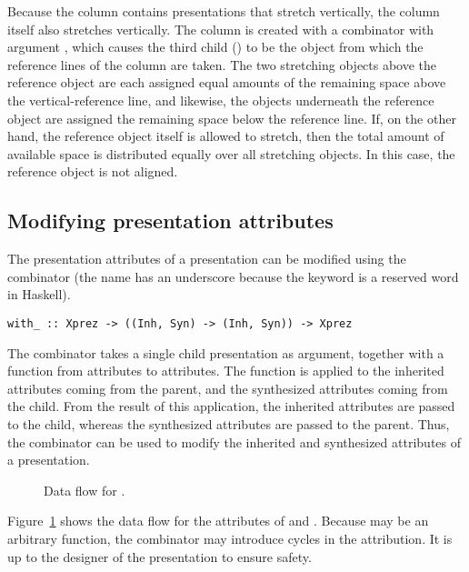 Because the column contains presentations that stretch vertically, the column itself also stretches vertically. The column is created with a  combinator with argument , which causes the third child () to be the object from which the reference lines of the column are taken.  The two stretching objects above the reference object are each assigned equal amounts of the remaining space above the vertical-reference line, and likewise, the objects underneath the reference object are assigned the remaining space below the reference line. If, on the other hand, the reference object itself is allowed to stretch, then the total amount of available space is distributed equally over all stretching objects. In this case, the reference object is not aligned. 

%																
\subsection{Modifying presentation attributes}

The presentation attributes of a presentation can be modified using the  combinator (the name has an underscore because the keyword  is a reserved word in Haskell).

\begin{small}
\begin{verbatim}
with_ :: Xprez -> ((Inh, Syn) -> (Inh, Syn)) -> Xprez
\end{verbatim}
\end{small}

The combinator takes a single child presentation as argument, together with a function from attributes to attributes. The function is applied to the inherited attributes coming from the parent, and the synthesized attributes coming from the child. From the result of this application, the inherited attributes are passed to the child, whereas the synthesized attributes are passed to the parent. Thus, the  combinator can be used to modify the inherited and synthesized attributes of a presentation.

\begin{figure}[t]
\begin{center}
\caption{Data flow for .}\label{withDataFlow} 
\end{center}
\end{figure}


Figure~\ref{withDataFlow} shows the data flow for the attributes of  and . Because  may be an arbitrary function, the combinator may introduce cycles in the attribution. It is up to the designer of the presentation to ensure safety.


